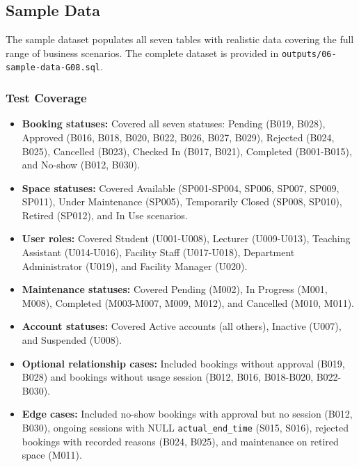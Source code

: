 
\subsection{Sample Data}

The sample dataset populates all seven tables with realistic data covering the full range of business scenarios. The complete dataset is provided in \texttt{outputs/06-sample-data-G08.sql}.

\subsubsection{Test Coverage}

\begin{itemize}
	\item \textbf{Booking statuses:} Covered all seven statuses: Pending (B019, B028), Approved (B016, B018, B020, B022, B026, B027, B029), Rejected (B024, B025), Cancelled (B023), Checked In (B017, B021), Completed (B001-B015), and No-show (B012, B030).
	\item \textbf{Space statuses:} Covered Available (SP001-SP004, SP006, SP007, SP009, SP011), Under Maintenance (SP005), Temporarily Closed (SP008, SP010), Retired (SP012), and In Use scenarios.
	\item \textbf{User roles:} Covered Student (U001-U008), Lecturer (U009-U013), Teaching Assistant (U014-U016), Facility Staff (U017-U018), Department Administrator (U019), and Facility Manager (U020).
	\item \textbf{Maintenance statuses:} Covered Pending (M002), In Progress (M001, M008), Completed (M003-M007, M009, M012), and Cancelled (M010, M011).
	\item \textbf{Account statuses:} Covered Active accounts (all others), Inactive (U007), and Suspended (U008).
	\item \textbf{Optional relationship cases:} Included bookings without approval (B019, B028) and bookings without usage session (B012, B016, B018-B020, B022-B030).
	\item \textbf{Edge cases:} Included no-show bookings with approval but no session (B012, B030), ongoing sessions with NULL \texttt{actual\_end\_time} (S015, S016), rejected bookings with recorded reasons (B024, B025), and maintenance on retired space (M011).
\end{itemize}

